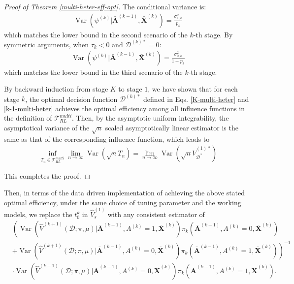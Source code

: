 \documentclass[11pt]{article}
\theoremstyle{referenceplain}
\theoremstyle{referencedefinition}
\theoremstyle{referenceremark}
\begin{document}
\begin{proof}[Proof of Theorem \ref{multi-heter-eff-opt}]
The conditional variance is:
\begin{align}
    \operatorname{Var}(\psi^{(k)} | \bar{\mathbf{A}}^{(k-1)}, \bar{\mathbf{X}}^{(k)}) = \frac{\sigma_{1,k}^2}{p_k}
\end{align}
which matches the lower bound in the second scenario of the $k$-th stage.
By symmetric arguments, when $\tau_k < 0$ and $\mathcal{D}^{(k)*} = 0$:
\begin{align}
    \operatorname{Var}(\psi^{(k)} | \bar{\mathbf{A}}^{(k-1)}, \bar{\mathbf{X}}^{(k)}) = \frac{\sigma_{0,k}^2}{1-p_k}
\end{align}
which matches the lower bound in the third scenario of the $k$-th stage.


By backward induction from stage $K$ to stage $1$, we have shown that for each stage $k$, the optimal decision function $\mathcal{D}^{(k)*}$ defined in Eqs. \eqref{K-multi-heter} and \eqref{k-1-multi-heter} achieves the optimal efficiency among all influence functions in the definition of $\mathcal{T}_{RL}^{multi}$. Then, by the asymptotic uniform integrability, the asymptotical variance of the $\sqrt{n}$ scaled asymptotically linear estimator is the same as that of the corresponding influence function, which leads to
\begin{align}
    \inf_{T_n \in \mathcal{T}_{RL}^{multi}} \lim_{n \to \infty} \operatorname{Var}(\sqrt{n} T_n) = \lim_{n \to \infty} \operatorname{Var}(\sqrt{n} \widehat{V}_{\mathcal{D}^*}^{(1)*})
\end{align}

This completes the proof.
\end{proof}
Then, in terms of the data driven implementation of achieving the above stated optimal efficiency, under the same choice of tuning parameter and the working models, we replace the $t_0^k$ in $\widehat{V}_s^{(1)}$ with any consistent estimator of 
\begin{align*}
     &\left(\operatorname{Var}(\widehat{V}^{(k+1)}(\mathcal{D};\pi,\mu)|\bar{\mathbf{A}}^{(k-1)},A^{(k)}=1,\bar{\mathbf{X}}^{(k)})\pi_k(\bar{\mathbf{A}}^{(k-1)},A^{(k)}=0,\bar{\mathbf{X}}^{(k)})\right.\\
   &+\left.\operatorname{Var}(\widehat{V}^{(k+1)}(\mathcal{D};\pi,\mu)|\bar{\mathbf{A}}^{(k-1)},A^{(k)}=0,\bar{\mathbf{X}}^{(k)})\pi_k(\bar{\mathbf{A}}^{(k-1)},A^{(k)}=1,\bar{\mathbf{X}}^{(k)})\right)^{-1}\\
   &\cdot \operatorname{Var}(\widehat{V}^{(k+1)}(\mathcal{D};\pi,\mu)|\bar{\mathbf{A}}^{(k-1)},A^{(k)}=0,\bar{\mathbf{X}}^{(k)})\pi_k(\bar{\mathbf{A}}^{(k-1)},A^{(k)}=1,\bar{\mathbf{X}}^{(k)}).
\end{align*}
\end{document}
